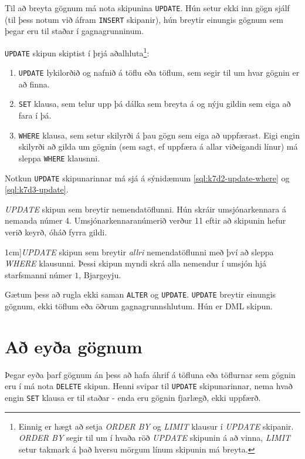 Til að breyta gögnum má nota skipunina \verb|UPDATE|. Hún setur ekki inn gögn sjálf (til þess notum við áfram \verb|INSERT| skipanir), hún breytir einungis gögnum sem þegar eru til staðar í gagnagrunninum.

\verb|UPDATE| skipun skiptist í þrjá aðalhluta\footnote{Einnig er hægt að setja \emph{ORDER BY} og \emph{LIMIT} klausur í \emph{UPDATE} skipanir. \emph{ORDER BY} segir til um í hvaða röð \emph{UPDATE} skipunin á að vinna, \emph{LIMIT} setur takmark á það hversu mörgum línum skipunin má breyta.}:
\begin{enumerate}
 \item \verb|UPDATE| lykilorðið og nafnið á töflu eða töflum, sem segir til um hvar gögnin er að finna.
 \item \verb|SET| klausa, sem telur upp þá dálka sem breyta á og nýju gildin sem eiga að fara í þá.
 \item \verb|WHERE| klausa, sem setur skilyrði á þau gögn sem eiga að uppfærast. Eigi engin skilyrði að gilda um gögnin (sem sagt, ef uppfæra á allar viðeigandi línur) má sleppa \verb|WHERE| klausnni. 
\end{enumerate}
Notkun \verb|UPDATE| skipunarinnar má sjá á sýnidæmum \ref{sql:k7d2-update-where} og \ref{sql:k7d3-update}.

\begin{example}
\caption[UPDATE með WHERE]{\emph{UPDATE} skipun sem breytir nemendatöflunni. Hún skráir umsjónarkennara á nemanda númer 4. Umsjónarkennaranúmerið verður 11 eftir að skipunin hefur verið keyrð, óháð fyrra gildi.}
\label{sql:k7d2-update-where}
\centering
{}
\end{example}

\begin{example}
\caption[UPDATE án WHERE][1cm]{\emph{UPDATE} skipun sem breytir \emph{allri} nemendatöflunni með því að sleppa \emph{WHERE} klausunni. Þessi skipun myndi skrá alla nemendur í umsjón hjá starfsmanni númer $1$, Bjargeyju.}
\vspace{1cm}
\label{sql:k7d3-update}
\centering
{}
\end{example}

Gætum þess að rugla ekki saman \verb|ALTER| og \verb|UPDATE|. \verb|UPDATE| breytir einungis gögnum, ekki töflum eða öðrum gagnagrunnshlutum. Hún er DML skipun.
\section{Að eyða gögnum}
Þegar eyða þarf gögnum án þess að hafa áhrif á töfluna eða töflurnar sem gögnin eru í má nota \verb|DELETE| skipun. Henni svipar til \verb|UPDATE| skipunarinnar, nema hvað engin \verb|SET| klausa er til staðar - enda eru gögnin fjarlægð, ekki uppfærð.

